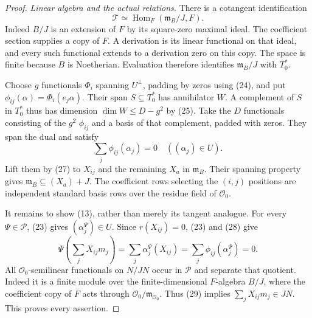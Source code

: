 \begin{proof}
\emph{Linear algebra and the actual relations.}
There is a cotangent identification
\[
           \mathcal T\simeq
              \operatorname{Hom}_F(\mathfrak m_B/J,F).         \tag{27}
\]
Indeed $B/J$ is an extension of $F$ by its square-zero maximal
ideal.  The coefficient section supplies a copy of $F$.
A derivation is its linear functional on that ideal, and every
such functional extends to a derivation zero on this copy.
The space is finite because $B$ is Noetherian.
Evaluation therefore identifies $\mathfrak m_B/J$ with $T_0^*$.

Choose $g$ functionals $\Phi_i$ spanning $U^\perp$, padding by
zeros using (24), and put
$\phi_{ij}(\alpha)=\Phi_i(e_j\alpha)$.
Their span $S\subseteq T_0^*$ has annihilator $W$.
A complement of $S$ in $T_0^*$ thus has dimension
$\dim W\leq D-g^2$ by (25).
Take the $D$ functionals consisting of the $g^2$
$\phi_{ij}$ and a basis of that complement, padded with zeros.
They span the dual and satisfy
\[
            \sum_j\phi_{ij}(\alpha_j)=0\quad((\alpha_j)\in U).
                                                               \tag{28}
\]
Lift them by (27) to $X_{ij}$ and the remaining $X_a$ in
$\mathfrak m_B$.  Their spanning property gives
$\mathfrak m_B\subseteq(X_a)+J$.
The coefficient rows selecting the $(i,j)$ positions are
independent standard basis rows over the residue field of
$\mathcal O_0$.

It remains to show (13), rather than merely its tangent
analogue.  For every $\Psi\in\mathcal P$, (23) gives
$(\alpha_j^\Psi)\in U$.  Since $r(X_{ij})=0$, (23) and (28)
give
\[
 \Psi\left(\sum_jX_{ij}m_j\right)
     =\sum_j\alpha_j^\Psi(X_{ij})
     =\sum_j\phi_{ij}(\alpha_j^\Psi)=0.                         \tag{29}
\]
All $\mathcal O_0$-semilinear functionals on $N/JN$ occur in
$\mathcal P$ and separate that quotient.
Indeed it is a finite module over the finite-dimensional
$F$-algebra $B/J$, where the coefficient copy of $F$ acts
through $\mathcal O_0/\mathfrak m_{\mathcal O_0}$.
Thus (29) implies $\sum_jX_{ij}m_j\in JN$.
This proves every assertion.
\end{proof}

